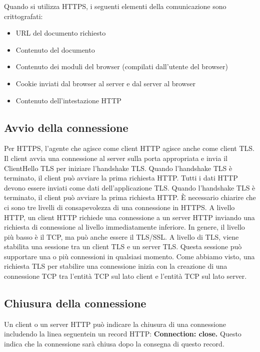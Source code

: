 \singlespacing

Quando si utilizza HTTPS, i seguenti elementi della comunicazione sono crittografati:

\begin{itemize}
    \item URL del documento richiesto
    
    \item Contenuto del documento
    
    \item Contenuto dei moduli del browser (compilati dall'utente del browser)
    
    \item  Cookie inviati dal browser al server e dal server al browser
    
    \item  Contenuto dell'intestazione HTTP
\end{itemize}

\subsection{Avvio della connessione}
Per HTTPS, l'agente che agisce come client HTTP agisce anche come client TLS. Il client avvia una connessione al server sulla porta appropriata e invia il ClientHello TLS per iniziare l'handshake TLS. Quando l'handshake TLS è terminato, il client può avviare la prima richiesta HTTP. Tutti i dati HTTP devono essere inviati come dati dell'applicazione TLS. Quando l'handshake TLS è terminato, il client può avviare la prima richiesta HTTP. È necessario chiarire che ci sono tre livelli di consapevolezza di una connessione in HTTPS. A livello HTTP, un client HTTP richiede una connessione a un server HTTP inviando una richiesta di connessione al livello immediatamente inferiore. In genere, il livello più basso è il TCP, ma può anche essere il TLS/SSL. A livello di TLS, viene stabilita una sessione tra un client TLS e un server TLS. Questa sessione può supportare una o più connessioni in qualsiasi momento. Come abbiamo visto, una richiesta TLS per stabilire una connessione inizia con la creazione di una connessione TCP tra l'entità TCP sul lato client e l'entità TCP sul lato server. 

\subsection{Chiusura della connessione}
Un client o un server HTTP può indicare la chiusura di una connessione includendo la linea seguentein un record HTTP: \textbf{Connection: close.} Questo indica che la connessione sarà chiusa dopo la consegna di questo record.

